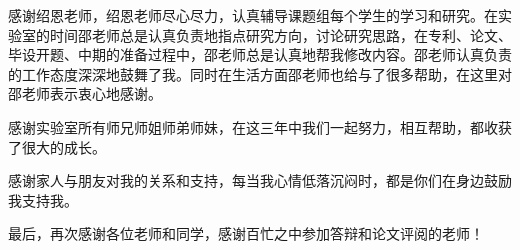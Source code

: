 感谢绍恩老师，绍恩老师尽心尽力，认真辅导课题组每个学生的学习和研究。在实验室的时间邵老师总是认真负责地指点研究方向，讨论研究思路，在专利、论文、毕设开题、中期的准备过程中，邵老师总是认真地帮我修改内容。邵老师认真负责的工作态度深深地鼓舞了我。同时在生活方面邵老师也给与了很多帮助，在这里对邵老师表示衷心地感谢。

感谢实验室所有师兄师姐师弟师妹，在这三年中我们一起努力，相互帮助，都收获了很大的成长。

感谢家人与朋友对我的关系和支持，每当我心情低落沉闷时，都是你们在身边鼓励我支持我。

最后，再次感谢各位老师和同学，感谢百忙之中参加答辩和论文评阅的老师！

\cleardoublepage[plain]%
